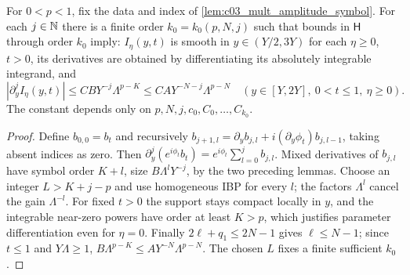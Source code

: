 \begin{lemma}
  \label{lem:c03_mult_parameter_ibp}
  For $0<p<1$, fix the data and index of \cref{lem:c03_mult_amplitude_symbol}.
  For each $j\in\mathbb{N}$ there is a finite order $k_0=k_0(p,N,j)$ such that bounds in $\mathsf H$
  through order $k_0$ imply: $I_\eta(y,t)$ is smooth in $y\in(Y/2,3Y)$ for each $\eta\ge0$, $t>0$,
  its derivatives are obtained by differentiating its absolutely integrable integrand, and
  \[
    |\partial_y^jI_\eta(y,t)|\le C B Y^{-j}\Lambda^{p-K}
         \le C A Y^{-N-j}\Lambda^{p-N}\quad(y\in[Y,2Y],\ 0<t\le1,\ \eta\ge0).
  \]
  The constant depends only on $p,N,j,c_0,C_0,\ldots,C_{k_0}$.
\end{lemma}
\begin{proof}
  Define $b_{0,0}=b_t$ and recursively
  $b_{j+1,l}=\partial_yb_{j,l}+i(\partial_y\phi_t)b_{j,l-1}$, taking absent indices as zero.
  Then $\partial_y^j(e^{i\phi_t}b_t)=e^{i\phi_t}\sum_{l=0}^j b_{j,l}$.
  Mixed derivatives of $b_{j,l}$ have symbol order $K+l$, size $B\Lambda^lY^{-j}$,
  by the two preceding lemmas. Choose an integer $L>K+j-p$ and use homogeneous IBP for
  every $l$; the factors $\Lambda^l$ cancel the gain $\Lambda^{-l}$.
  For fixed $t>0$ the support stays compact locally in $y$, and the integrable near-zero
  powers have order at least $K>p$, which justifies parameter differentiation even for $\eta=0$.
  Finally $2\ell+q_1\le2N-1$ gives $\ell\le N-1$; since $t\le1$ and $Y\Lambda\ge1$,
  $B\Lambda^{p-K}\le AY^{-N}\Lambda^{p-N}$. The chosen $L$ fixes a finite sufficient $k_0$.
\end{proof}

